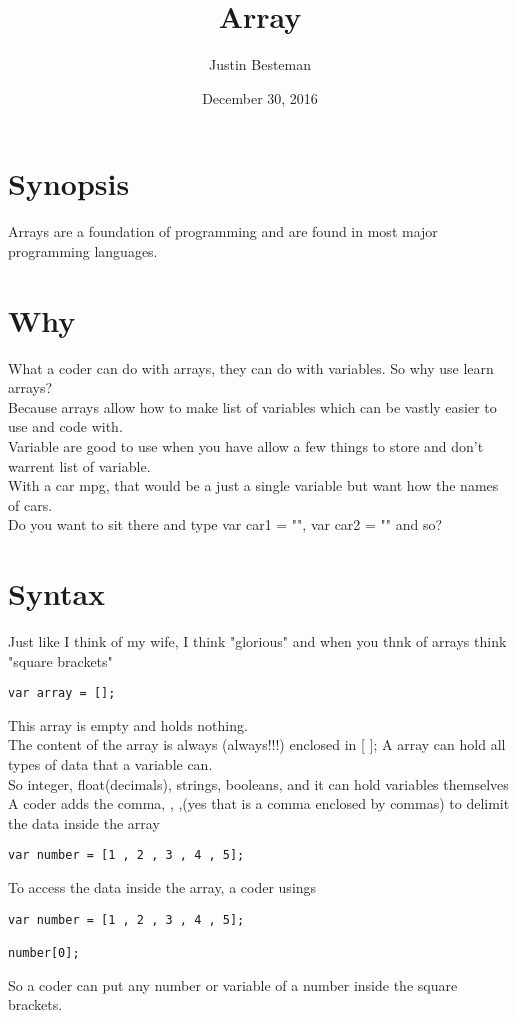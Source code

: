 \documentclass[12pt, letterpaper]{article}
\title{Array}
\author{Justin Besteman}
\date{December 30, 2016}
\begin{document}
\maketitle


\section*{Synopsis}

Arrays are a foundation of programming and are found in most major programming languages.

\section*{Why}

What a coder can do with arrays, they can do with variables. So why use learn arrays? \\
Because arrays allow how to make list of variables which can be vastly easier to use and code with.\\
Variable are good to use when you have allow a few things to store and don't warrent list of variable. \\
With a car mpg, that would be a just a single variable but want how the names of cars. \\
Do you want to sit there and type var car1 = "", var car2 = "" and so? \\


\section*{Syntax}

Just like I think of my wife, I think "glorious" and when you thnk of arrays think "square brackets"
\begin{lstlisting}
var array = [];
\end{lstlisting}
This array is empty and holds nothing. \\
The content of the array is always (always!!!) enclosed in [ ];
A array can hold all types of data that a variable can. \\
So integer, float(decimals), strings, booleans, and it can hold variables themselves\\
A coder adds the comma, , ,(yes that is a comma enclosed by commas) to delimit the data inside the array\\
\begin{lstlisting}
var number = [1 , 2 , 3 , 4 , 5];
\end{lstlisting}
To access the data inside the array, a coder usings 
\begin{lstlisting}
var number = [1 , 2 , 3 , 4 , 5];

number[0];
\end{lstlisting}
So a coder can put any number or variable of a number inside the square brackets. 
\end{document}
